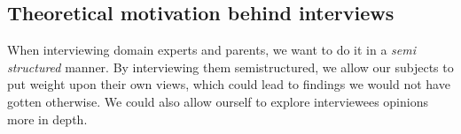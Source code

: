 \subsection{Theoretical motivation behind interviews}
When interviewing domain experts and parents, we want to do it in a \emph{semi structured} manner. By interviewing them semistructured, we allow our subjects to put weight upon their own views, which could lead to findings we would not have gotten otherwise. We could also allow ourself to explore interviewees opinions more in depth. 

  



